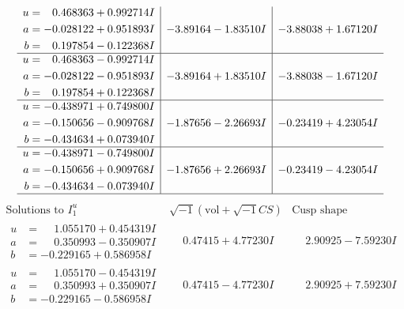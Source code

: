 \documentclass[1p]{elsarticle_modified}
\theoremstyle{definition}
\newcommand{\I}{\sqrt{-1}}
\begin{document}
$$\begin{array}{c|c|c}
\begin{aligned}
u &= \phantom{-}0.468363 + 0.992714 I \\
a &= -0.028122 + 0.951893 I \\
b &= \phantom{-}0.197854 - 0.122368 I\end{aligned}
 & -3.89164 - 1.83510 I & -3.88038 + 1.67120 I \\ \hline\begin{aligned}
u &= \phantom{-}0.468363 - 0.992714 I \\
a &= -0.028122 - 0.951893 I \\
b &= \phantom{-}0.197854 + 0.122368 I\end{aligned}
 & -3.89164 + 1.83510 I & -3.88038 - 1.67120 I \\ \hline\begin{aligned}
u &= -0.438971 + 0.749800 I \\
a &= -0.150656 - 0.909768 I \\
b &= -0.434634 + 0.073940 I\end{aligned}
 & -1.87656 - 2.26693 I & -0.23419 + 4.23054 I \\ \hline\begin{aligned}
u &= -0.438971 - 0.749800 I \\
a &= -0.150656 + 0.909768 I \\
b &= -0.434634 - 0.073940 I\end{aligned}
 & -1.87656 + 2.26693 I & -0.23419 - 4.23054 I\\
 \hline 
 \end{array}$$\newpage$$\begin{array}{c|c|c}  
\text{Solutions to }I^u_{1}& \I (\text{vol} + \sqrt{-1}CS) & \text{Cusp shape}\\
 \hline 
\begin{aligned}
u &= \phantom{-}1.055170 + 0.454319 I \\
a &= \phantom{-}0.350993 - 0.350907 I \\
b &= -0.229165 + 0.586958 I\end{aligned}
 & \phantom{-}0.47415 + 4.77230 I & \phantom{-}2.90925 - 7.59230 I \\ \hline\begin{aligned}
u &= \phantom{-}1.055170 - 0.454319 I \\
a &= \phantom{-}0.350993 + 0.350907 I \\
b &= -0.229165 - 0.586958 I\end{aligned}
 & \phantom{-}0.47415 - 4.77230 I & \phantom{-}2.90925 + 7.59230 I \\ \hline\begin{aligned}

\end{aligned}
\end{array}$$
\end{document}
